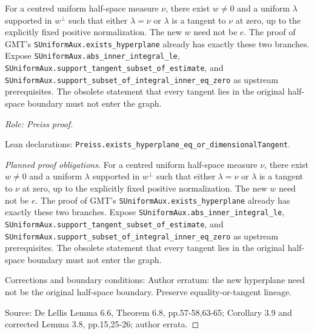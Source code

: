 \begin{lemma}
\label{lem:hyperplane-tangent-lineage}






For a centred uniform half-space measure $\nu$, there exist $w\ne0$ and a
uniform $\lambda$ supported in $w^\perp$ such that either $\lambda=\nu$
or $\lambda$ is a tangent to $\nu$ at zero, up to the explicitly fixed
positive normalization. The new $w$ need not be $e$.
The proof of GMT's \texttt{SUniformAux.exists\_hyperplane} already has
exactly these two branches. Expose
\texttt{SUniformAux.abs\_inner\_integral\_le},
\texttt{SUniformAux.support\_tangent\_subset\_of\_estimate}, and
\texttt{SUniformAux.support\_subset\_of\_integral\_inner\_eq\_zero}
as upstream prerequisites. The obsolete statement that every tangent lies in
the original half-space boundary must not enter the graph.
\par\emph{Role: Preiss proof.}
\par Lean declarations: \texttt{Preiss.exists\_hyperplane\_eq\_or\_dimensionalTangent}.
\end{lemma}
\begin{proof}[Planned proof obligations]

For a centred uniform half-space measure $\nu$, there exist $w\ne0$ and a
uniform $\lambda$ supported in $w^\perp$ such that either $\lambda=\nu$
or $\lambda$ is a tangent to $\nu$ at zero, up to the explicitly fixed
positive normalization. The new $w$ need not be $e$.
The proof of GMT's \texttt{SUniformAux.exists\_hyperplane} already has
exactly these two branches. Expose
\texttt{SUniformAux.abs\_inner\_integral\_le},
\texttt{SUniformAux.support\_tangent\_subset\_of\_estimate}, and
\texttt{SUniformAux.support\_subset\_of\_integral\_inner\_eq\_zero}
as upstream prerequisites. The obsolete statement that every tangent lies in
the original half-space boundary must not enter the graph.
\par Corrections and boundary conditions: Author erratum: the new hyperplane need not be the original half-space boundary. Preserve equality-or-tangent lineage.
\par Source: De Lellis Lemma 6.6, Theorem 6.8, pp.57-58,63-65; Corollary 3.9 and corrected Lemma 3.8, pp.15,25-26; author errata.
\end{proof}

